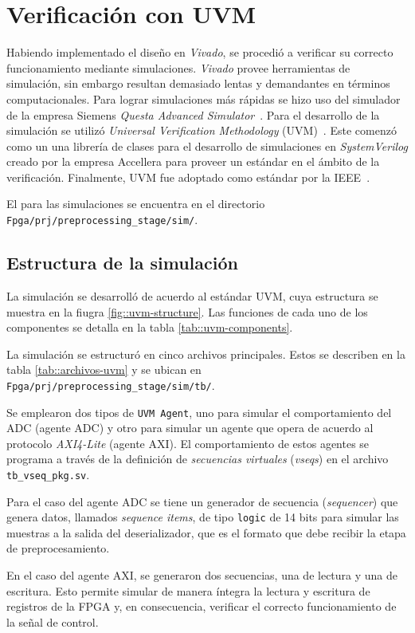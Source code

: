 \documentclass[../../main.tex]{subfiles}
\begin{document}
\section{Verificación con UVM}\label{sec::simu-uvm}
Habiendo implementado el diseño en \textit{Vivado}, se procedió a verificar su correcto funcionamiento mediante simulaciones. \textit{Vivado} provee herramientas de simulación, sin embargo resultan demasiado lentas y demandantes en términos computacionales. Para lograr simulaciones más rápidas se hizo uso del simulador de la empresa Siemens \textit{Questa Advanced Simulator}~\cite{questa}. 
Para el desarrollo de la simulación se utilizó \textit{Universal Verification Methodology} (UVM)~\cite{uvm}. Este comenzó como un una librería de clases para el desarrollo de simulaciones en \textit{SystemVerilog} creado por la empresa Accellera para proveer un estándar en el ámbito de la verificación. Finalmente, UVM fue adoptado como estándar por la IEEE~\cite{uvm-ieee}.

El para las simulaciones se encuentra en el directorio \texttt{Fpga/prj/preprocessing\_stage/sim/}.

\subsection{Estructura de la simulación}
La simulación se desarrolló de acuerdo al estándar UVM, cuya estructura se muestra en la fiugra \ref{fig::uvm-structure}. Las funciones de cada uno de los componentes se detalla en la tabla \ref{tab::uvm-components}.

La simulación se estructuró en cinco archivos principales. Estos se describen en la tabla \ref{tab::archivos-uvm} y se ubican en \texttt{Fpga/prj/preprocessing\_stage/sim/tb/}.

Se emplearon dos tipos de \texttt{UVM Agent}, uno para simular el comportamiento del ADC (agente ADC) y otro para simular un agente que opera de acuerdo al protocolo \textit{AXI4-Lite}\cite{AXI-4-lite} (agente AXI). El comportamiento de estos agentes se programa a través de la definición de \textit{secuencias virtuales} (\textit{vseqs}) en el archivo \texttt{tb\_vseq\_pkg.sv}.

Para el caso del agente ADC se tiene un generador de secuencia (\textit{sequencer}) que genera datos, llamados \textit{sequence items}, de tipo \texttt{logic} de 14 bits para simular las muestras a la salida del deserializador, que es el formato que debe recibir la etapa de preprocesamiento. 

En el caso del agente AXI, se generaron dos secuencias, una de lectura y una de escritura. Esto permite simular de manera íntegra la lectura y escritura de registros de la FPGA y, en consecuencia, verificar el correcto funcionamiento de la señal de control.
\end{document}
